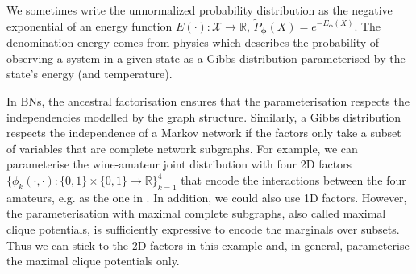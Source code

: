 We sometimes write the unnormalized probability distribution as the negative exponential of an energy function $E(\cdot): \mathcal{X} \rightarrow \mathbb{R}$, $\tilde{P}_{\bm{\phi}}(X) = e^{-E_{\bm{\phi}}(X)}$. The denomination energy comes from physics which describes the probability of observing a system in a given state as a Gibbs distribution parameterised by the state's energy (and temperature).

In BNs, the ancestral factorisation ensures that the parameterisation respects the independencies modelled by the graph structure. Similarly, a Gibbs distribution respects the independence of a Markov network if the factors only take a subset of variables that are complete network subgraphs. For example, we can parameterise the wine-amateur joint distribution with four 2D factors $\{\phi_k(\cdot,\cdot): \{ 0, 1\} \times \{ 0, 1\} \rightarrow \mathbb{R}\}_{k=1}^4$ that encode the interactions between the four amateurs, e.g. as the one in . In addition, we could also use 1D factors. However, the parameterisation with maximal complete subgraphs, also called maximal clique potentials, is sufficiently expressive to encode the marginals over subsets. Thus we can stick to the 2D factors in this example and, in general, parameterise the maximal clique potentials only.

